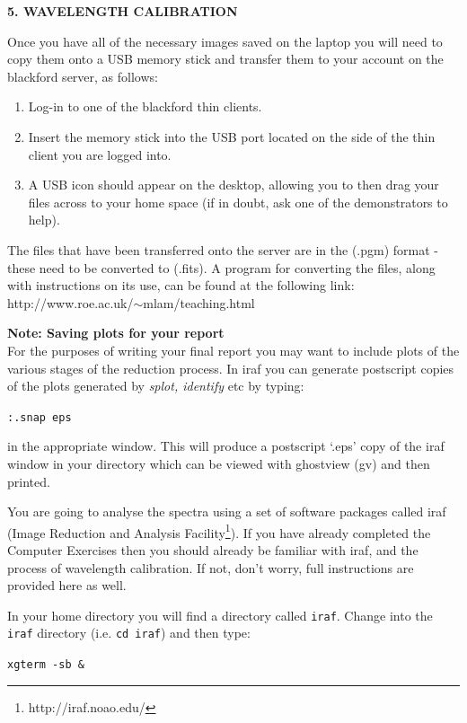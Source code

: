 \documentclass[12pt]{article}
\begin{document}
\newpage
{\bf 5. WAVELENGTH CALIBRATION}

\noindent
Once you have all of the necessary images saved on the laptop you will need to copy them onto a USB memory stick and transfer them to your account on the blackford server, as follows:

\begin{enumerate}
\item Log-in to one of the blackford thin clients.

\item Insert the memory stick into the USB port located on the side of the thin client you are logged into.

\item A USB icon should appear on the desktop, allowing you to then drag your files across to your home space (if in doubt, ask one of the demonstrators to help).\\
\end{enumerate}

The files that have been transferred onto the server are in the (.pgm) format - these need to be converted to (.fits).  A program for converting the files, along with instructions on its use, can be found at the following link: http://www.roe.ac.uk/$\sim$mlam/teaching.html

{\large {\bf Note: Saving plots for your report}}\\
For the purposes of writing your final report you may want to include plots of the various stages of the reduction process. In {\sc iraf} you can generate postscript copies of the plots generated by {\it splot, identify} etc by typing: 

{\tt :.snap eps}

in the appropriate window. This will produce a postscript `.eps' copy of the {\sc iraf} window in your directory which can be viewed with ghostview (gv) and then printed.

You are going to analyse the spectra using a set of software packages called {\sc iraf} (Image Reduction and Analysis Facility\footnote{http://iraf.noao.edu/}). If you have already completed the Computer Exercises then you should already be familiar with {\sc iraf}, and the process of wavelength calibration. If not, don't worry, full instructions are provided here as well.

In your home directory you will find a directory called {\tt iraf}. Change into the {\tt iraf} directory (i.e. {\tt cd iraf}) and then type:

{\tt \verb,xgterm -sb &,}
\end{document}
